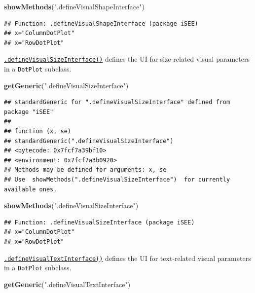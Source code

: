 \documentclass[
]{book}
\newenvironment{Shaded}{\begin{snugshade}}{\end{snugshade}}
\newcommand{\KeywordTok}[1]{\textcolor[rgb]{0.13,0.29,0.53}{\textbf{#1}}}
\newcommand{\NormalTok}[1]{#1}
\newcommand{\StringTok}[1]{\textcolor[rgb]{0.31,0.60,0.02}{#1}}
\begin{document}
\begin{Shaded}
\begin{Highlighting}[]
\KeywordTok{showMethods}\NormalTok{(}\StringTok{".defineVisualShapeInterface"}\NormalTok{)}
\end{Highlighting}
\end{Shaded}

\begin{verbatim}
## Function: .defineVisualShapeInterface (package iSEE)
## x="ColumnDotPlot"
## x="RowDotPlot"
\end{verbatim}

\href{https://isee.github.io/iSEE/reference/visual-parameters-generics.html}{\texttt{.defineVisualSizeInterface()}} defines the UI for size-related visual parameters in a \texttt{DotPlot} subclass.

\begin{Shaded}
\begin{Highlighting}[]
\KeywordTok{getGeneric}\NormalTok{(}\StringTok{".defineVisualSizeInterface"}\NormalTok{)}
\end{Highlighting}
\end{Shaded}

\begin{verbatim}
## standardGeneric for ".defineVisualSizeInterface" defined from package "iSEE"
## 
## function (x, se) 
## standardGeneric(".defineVisualSizeInterface")
## <bytecode: 0x7fcf7a39bf10>
## <environment: 0x7fcf7a3b0920>
## Methods may be defined for arguments: x, se
## Use  showMethods(".defineVisualSizeInterface")  for currently available ones.
\end{verbatim}

\begin{Shaded}
\begin{Highlighting}[]
\KeywordTok{showMethods}\NormalTok{(}\StringTok{".defineVisualSizeInterface"}\NormalTok{)}
\end{Highlighting}
\end{Shaded}

\begin{verbatim}
## Function: .defineVisualSizeInterface (package iSEE)
## x="ColumnDotPlot"
## x="RowDotPlot"
\end{verbatim}

\href{https://isee.github.io/iSEE/reference/visual-parameters-generics.html}{\texttt{.defineVisualTextInterface()}} defines the UI for text-related visual parameters in a \texttt{DotPlot} subclass.

\begin{Shaded}
\begin{Highlighting}[]
\KeywordTok{getGeneric}\NormalTok{(}\StringTok{".defineVisualTextInterface"}\NormalTok{)}
\end{Highlighting}
\end{Shaded}
\end{document}
